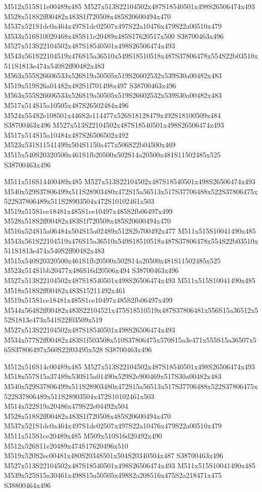 \documentclass{article}
\begin{document}
\begin{multicols}{2}
M512x515S11e00489x485 M527x513S22104502x487S18540501x498S26506474x493 M528x518S2ff00482x483S1f720508x485S20600494x470 M537x521S1dc0a464x497S1dc02507x497S22a10476x479S22a00510x479 M533x516S10020468x485S11e20489x485S17620517x500 S38700463x496 M527x513S22104502x487S18540501x498S26506474x493 M543x561S22104519x476S15a36510x549S18510518x487S37806478x554S22b03510x511S1813e474x540S2ff00482x483 M563x555S26606533x526S19a50505x519S26602532x539S30a00482x483 M519x519S26a01482x482S1f701498x497 S38700463x496 M563x555S26606533x526S19a50505x519S26602532x539S30a00482x483 M517x514S15a10505x487S26502484x496 M524x554S2e108501x446S2e114477x526S18128479x492S18100509x484 S38700463x496 M527x513S22104502x487S18540501x498S26506474x493 M517x514S15a10484x487S26506502x492 M523x531S11541499x504S1150a477x506S22b04500x469 M515x540S20320500x461S1fb20500x502S14a20500x481S11502485x525 S38700463x496

M511x516S14400489x485 M527x513S22104502x487S18540501x498S26506474x493 M540x529S37806499x511S28903480x472S15a56513x517S37706488x522S37806475x522S37806489x511S28903504x472S10102461x503 M519x515S1ce18481x485S1ce10497x485S2fb06497x499 M528x518S2ff00482x483S1f720508x485S20600494x470 M516x524S15a06484x504S15a02489x512S2b700492x477 M511x515S10041490x485 M543x561S22104519x476S15a36510x549S18510518x487S37806478x554S22b03510x511S1813e474x540S2ff00482x483 M515x540S20320500x461S1fb20500x502S14a20500x481S11502485x525 M523x514S1bb20477x486S16d20506x494 S38700463x496 M527x513S22104502x487S18540501x498S26506474x493 M511x515S10041490x485 M518x518S2ff00482x483S15211492x461 M519x515S1ce18481x485S1ce10497x485S2fb06497x499 M544x564S2ff00482x483S22104521x475S18510519x487S37806481x556S15a36512x552S1813e473x541S22f03509x519 M527x513S22104502x487S18540501x498S26506474x493 M534x577S2ff00482x483S1f503508x510S37806475x570S15a3e471x555S15a36507x565S37806497x560S22f03495x528 S38700463x496

M512x516S14c00489x485 M527x513S22104502x487S18540501x498S26506474x493 M518x557S15a37489x530S15a01490x529S2e900469x517S30a00482x483 M540x529S37806499x511S28903480x472S15a56513x517S37706488x522S37806475x522S37806489x511S28903504x472S10102461x503 M514x522S19a20486x479S22e04492x504 M528x518S2ff00482x483S1f720508x485S20600494x470 M537x521S1dc0a464x497S1dc02507x497S22a10476x479S22a00510x479 M511x515S1ce20489x485 M509x510S16d20492x490 M512x526S11e20489x474S17620496x510 M519x520S2ec00481x480S20348501x504S20340504x487 S38700463x496 M527x513S22104502x487S18540501x498S26506474x493 M511x515S10041490x485 M539x525S15a30461x498S15a50505x498S2a208516x475S2a218471x475 S38800464x496


\end{multicols}
\end{document}
